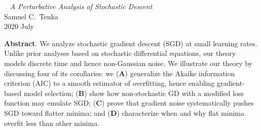 \documentclass[openany, notitlepage, justified]{tufte-book}
\theoremstyle{plain}
\theoremstyle{definition}
\begin{document}
    \begin{center}\
        \Huge
        \emph{A Perturbative Analysis of Stochastic Descent}\\
        \vspace{0.5cm}
        \LARGE
        Samuel C.~Tenka \\
        \vspace{0.5cm}
        2020 July
    \end{center}
    
    
    \vspace{0.75cm}
    \textbf{Abstract}.
        We analyze stochastic gradient descent (SGD) at small learning rates.
        Unlike prior analyses based on stochastic differential equations, our
        theory models discrete time and hence non-Gaussian noise.
        We illustrate our theory by discussing four of its corollaries: we
        (\textbf{A}) generalize the Akaike information criterion (AIC) to a
        smooth estimator of overfitting, hence enabling gradient-based model
        selection;
        (\textbf{B}) show how non-stochastic GD with a modified loss
        function may emulate SGD;
        (\textbf{C}) prove that gradient noise systematically pushes SGD
        toward flatter minima; and
        (\textbf{D}) characterize when and why flat minima overfit less than
        other minima.

 
\end{document}

